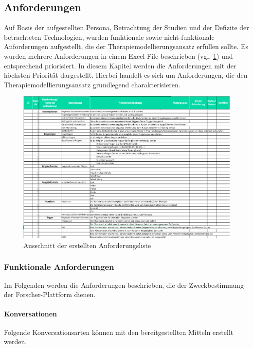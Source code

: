\subsection{Anforderungen}
Auf Basis der aufgestellten Persona, Betrachtung der Studien und der Defizite der betrachteten Technologien, wurden funktionale sowie nicht-funktionale Anforderungen aufgestellt, die der Therapiemodellierungsansatz erfüllen sollte. Es wurden mehrere Anforderungen in einem Excel-File beschrieben (vgl. \ref{anforderungen}) und entsprechend priorisiert. In diesem Kapitel werden die Anforderungen mit der höchsten Priorität dargestellt. Hierbei handelt es sich um Anforderungen, die den Therapiemodellierungsansatz grundlegend charakterisieren.

\begin{figure}[h]
\centering
\includegraphics[width=1\textwidth]{pictures/anforderungen}
\caption{Ausschnitt der erstellten Anforderungsliste}
\label{anforderungen}
\end{figure}

\subsubsection{Funktionale Anforderungen}
Im Folgenden werden die Anforderungen beschrieben, die der Zweckbestimmung der Forscher-Plattform dienen.

\paragraph{Konversationen}
Folgende Konversationsarten können mit den bereitgestellten Mitteln erstellt werden.

